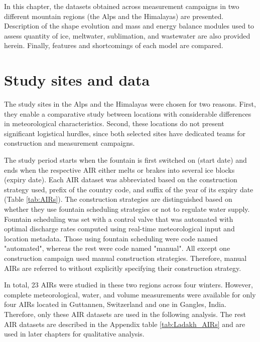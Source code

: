 In this chapter, the datasets obtained across measurement campaigns in two different mountain regions (the Alps and
the Himalayas) are presented. Description of the shape evolution and mass and energy balance modules used to assess quantity of ice, meltwater, sublimation, and wastewater are also provided herein.
Finally, features and shortcomings of each model are compared.

\section{Study sites and data}

The study sites in the Alps and the Himalayas were chosen for two reasons. First, they enable a
comparative study between locations with considerable differences in meteorological characteristics. Second,
these locations do not present significant logistical hurdles, since both selected sites have dedicated
teams for construction and measurement campaigns.

The study period starts when the fountain is first switched on (start date) and ends when the respective AIR
either melts or brakes into several ice blocks (expiry date). Each AIR dataset was abbreviated based on the
construction strategy used, prefix of the country code, and suffix of the year of its expiry date
(Table \ref{tab:AIRs}). The construction strategies are distinguished based on whether they use fountain scheduling
strategies or not to regulate water supply. Fountain scheduling was set with a control valve that was automated
with optimal discharge rates computed using real-time meteorological input and location metadata. Those using fountain scheduling were
code named "automated", whereas the rest were code named "manual". All except one construction campaign used
manual construction strategies. Therefore, manual \ac{AIRs} are referred to without explicitly
specifying their construction strategy.

In total, 23 \ac{AIRs} were studied in these two regions across four winters. However, complete meteorological, water, and volume measurements were available for only four \ac{AIRs} located in
Guttannen, Switzerland and one in Gangles, India. Therefore,
only these AIR datasets are used in the following analysis. The rest AIR datasets are described in the
Appendix table \ref{tab:Ladakh_AIRs} and are used in later chapters for qualitative analysis.

